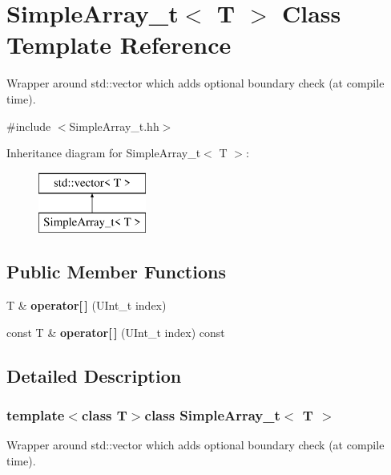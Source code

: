 \section{Simple\-Array\-\_\-t$<$ T $>$ Class Template Reference}
\label{classSimpleArray__t}


Wrapper around std\-::vector which adds optional boundary check (at compile time).  




{\ttfamily \#include $<$Simple\-Array\-\_\-t.\-hh$>$}

Inheritance diagram for Simple\-Array\-\_\-t$<$ T $>$\-:\begin{figure}[H]
\begin{center}
\leavevmode
\includegraphics[height=2.000000cm]{classSimpleArray__t}
\end{center}
\end{figure}
\subsection*{Public Member Functions}
\begin{DoxyCompactItemize}
\item 
T \& {\bfseries operator[$\,$]} (U\-Int\-\_\-t index)\label{classSimpleArray__t_a72e9bd2e6f3d937d9033079996d86e6d}

\item 
const T \& {\bfseries operator[$\,$]} (U\-Int\-\_\-t index) const \label{classSimpleArray__t_a840667681d487279ea8dc81faa147c77}

\end{DoxyCompactItemize}


\subsection{Detailed Description}
\subsubsection*{template$<$class T$>$class Simple\-Array\-\_\-t$<$ T $>$}

Wrapper around std\-::vector which adds optional boundary check (at compile time). 

